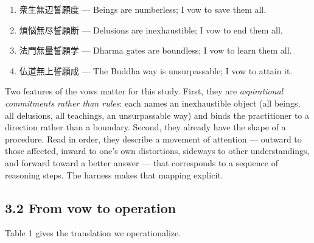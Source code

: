 \documentclass[
  11pt,
]{article}
\providecommand{\tightlist}{%
  \setlength{\itemsep}{0pt}\setlength{\parskip}{0pt}}
\begin{document}
\begin{enumerate}
\def\labelenumi{\arabic{enumi}.}
\tightlist
\item
  衆生無辺誓願度 --- Beings are numberless; I vow to save them all.
\item
  煩悩無尽誓願断 --- Delusions are inexhaustible; I vow to end them all.
\item
  法門無量誓願学 --- Dharma gates are boundless; I vow to learn them
  all.
\item
  仏道無上誓願成 --- The Buddha way is unsurpassable; I vow to attain
  it.
\end{enumerate}

Two features of the vows matter for this study. First, they are
\emph{aspirational commitments rather than rules}: each names an
inexhaustible object (all beings, all delusions, all teachings, an
unsurpassable way) and binds the practitioner to a direction rather than
a boundary. Second, they already have the shape of a procedure. Read in
order, they describe a movement of attention --- outward to those
affected, inward to one's own distortions, sideways to other
understandings, and forward toward a better answer --- that corresponds
to a sequence of reasoning steps. The harness makes that mapping
explicit.

\subsection{3.2 From vow to operation}\label{from-vow-to-operation}

Table 1 gives the translation we operationalize.
\end{document}
